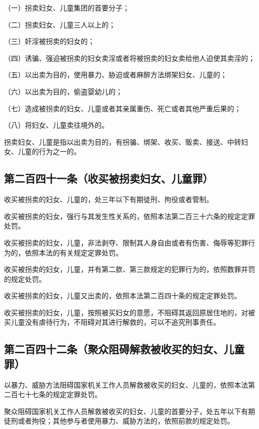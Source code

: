 \documentclass[utf-8,10pt]{ctexart}
\begin{document}
（一）拐卖妇女、儿童集团的首要分子；

（二）拐卖妇女、儿童三人以上的；

（三）奸淫被拐卖的妇女的；

（四）诱骗、强迫被拐卖的妇女卖淫或者将被拐卖的妇女卖给他人迫使其卖淫的；

（五）以出卖为目的，使用暴力、胁迫或者麻醉方法绑架妇女、儿童的；

（六）以出卖为目的，偷盗婴幼儿的；

（七）造成被拐卖的妇女、儿童或者其亲属重伤、死亡或者其他严重后果的；

（八）将妇女、儿童卖往境外的。

拐卖妇女、儿童是指以出卖为目的，有拐骗、绑架、收买、贩卖、接送、中转妇女、儿童的行为之一的。
\subsection{第二百四十一条（收买被拐卖妇女、儿童罪）}
收买被拐卖的妇女、儿童的，处三年以下有期徒刑、拘役或者管制。

收买被拐卖的妇女，强行与其发生性关系的，依照本法第二百三十六条的规定定罪处罚。

收买被拐卖的妇女，儿童，非法剥夺、限制其人身自由或者有伤害、侮辱等犯罪行为的，依照本法的有关规定定罪处罚。

收买被拐卖的妇女，儿童，并有第二款、第三款规定的犯罪行为的，依照数罪并罚的规定处罚。

收买被拐卖的妇女，儿童又出卖的，依照本法第二百四十条的规定定罪处罚。

收买被拐卖的妇女，儿童，按照被买妇女的意愿，不阻碍其返回原居住地的，对被买儿童没有虐待行为，不阻碍对其进行解救的，可以不追究刑事责任。
\subsection{第二百四十二条（聚众阻碍解救被收买的妇女、儿童罪）}
以暴力、威胁方法阻碍国家机关工作人员解救被收买的妇女、儿童的，依照本法第二百七十七条的规定定罪处罚。

聚众阻碍国家机关工作人员解救被收买的妇女、儿童的首要分子，处五年以下有期徒刑或者拘役；其他参与者使用暴力、威胁方法的，依照前款的规定处罚。
\end{document}
